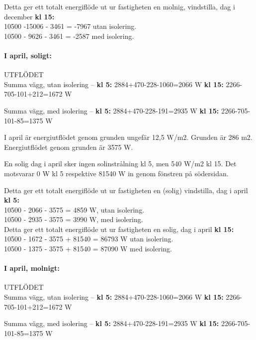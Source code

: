 Detta ger ett totalt energiflöde ut ur fastigheten en molnig, vindstilla, dag i december \textbf{kl 15:}\\
10500 -15006 - 3461 = -7967 utan isolering.\\
10500 - 9626 - 3461 = -2587 med isolering.\\


\paragraph{I april, soligt:}
UTFLÖDET\\
Summa vägg, utan isolering –
\textbf{kl 5:} 2884+470-228-1060=2066 W
\textbf{kl 15:} 2266-705-101+212=1672 W

Summa vägg, med isolering –
\textbf{kl 5:} 2884+470-228-191=2935 W
\textbf{kl 15:} 2266-705-101-85=1375 W

I april är energiutflödet genom grunden ungefär 12,5 W/m2. Grunden är 286 m2.\\
Energiutflödet genom grunden är 3575 W.

En solig dag i april sker ingen solinstrålning kl 5, men 540 W/m2 kl 15. Det motsvarar 0 W kl 5 respektive 81540 W in genom fönstren på södersidan.

Detta ger ett totalt energiflöde ut ur fastigheten en (solig) vindstilla, dag i april \textbf{kl 5:}\\
10500 - 2066 - 3575 =  4859 W, utan isolering.\\
10500 - 2935 - 3575 =  3990 W, med isolering.\\

Detta ger ett totalt energiflöde ut ur fastigheten en solig, dag i april \textbf{kl 15:}\\
10500 - 1672 - 3575 + 81540 = 86793 W utan isolering.\\
10500 - 1375 - 3575 + 81540  =  87090 W med isolering.\\



\paragraph{I april, molnigt:}
UTFLÖDET\\
Summa vägg, utan isolering –
\textbf{kl 5:} 2884+470-228-1060=2066 W
\textbf{kl 15:} 2266-705-101+212=1672 W

Summa vägg, med isolering –
\textbf{kl 5:} 2884+470-228-191=2935 W
\textbf{kl 15:} 2266-705-101-85=1375 W

